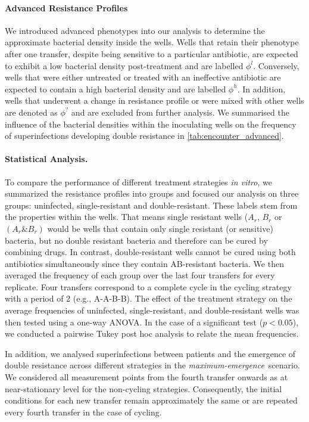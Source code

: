\paragraph{Advanced Resistance Profiles}
We introduced advanced phenotypes into our analysis to determine the approximate bacterial density inside the wells. 
Wells that retain their phenotype after one transfer, despite being sensitive to a particular antibiotic, are expected to exhibit a low bacterial density post-treatment and are labelled $\phi^l$. 
Conversely, wells that were either untreated or treated with an ineffective antibiotic are expected to contain a high bacterial density and are labelled $\phi^h$. 
In addition, wells that underwent a change in resistance profile or were mixed with other wells are denoted as $\phi^?$ and are excluded from further analysis.
We summarised the influence of the bacterial densities within the inoculating wells on the frequency of superinfections developing double resistance in \autoref{tab:encounter_advanced}.


\paragraph{Statistical Analysis. \label{ssec:statistics}}
To compare the performance of different treatment strategies \textit{in vitro}, we summarized the resistance profiles into groups and focused our analysis on three groups: uninfected, single-resistant and double-resistant. 
These labels stem from the properties within the wells. 
That means single resistant wells ($A_r$, $B_r$ or $(A_r\&B_r)$ would be wells that contain only single resistant (or sensitive) bacteria, but no double resistant bacteria and therefore can be cured by combining drugs. 
In contrast, double-resistant wells cannot be cured using both antibiotics simultaneously since they contain AB-resistant bacteria. 
We then averaged the frequency of each group over the last four transfers for every replicate. 
Four transfers correspond to a complete cycle in the cycling strategy with a period of 2 (e.g., A-A-B-B). 
The effect of the treatment strategy on the average frequencies of uninfected, single-resistant, and double-resistant wells was then tested using a one-way ANOVA. 
In the case of a significant test ($p < 0.05$), we conducted a pairwise Tukey post hoc analysis to relate the mean frequencies.

In addition, we analysed superinfections between patients and the emergence of double resistance across different strategies in the \textit{maximum-emergence}~scenario. 
We considered all measurement points from the fourth transfer onwards as at near-stationary level for the non-cycling strategies. 
Consequently, the initial conditions for each new transfer remain approximately the same or are repeated every fourth transfer in the case of cycling.

